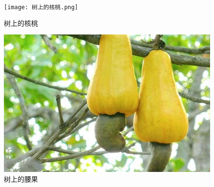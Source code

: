 \begin{figure}[htbp]
	\centering
	\texttt{[image: 树上的核桃.png]}
	\caption{树上的核桃}
	\label{fig:树上的核桃}
\end{figure}

\begin{figure}[htbp]
	\centering
	\includegraphics[width=0.5\linewidth]{Pics/树上的腰果}
	\caption{树上的腰果}
	\label{fig:树上的腰果}
\end{figure}



